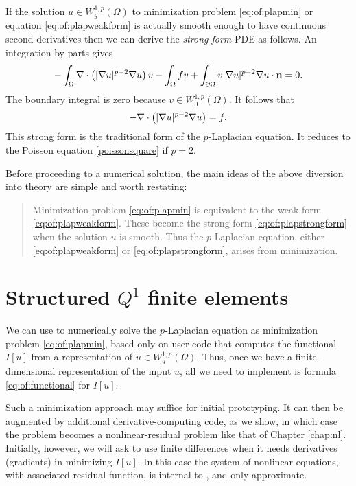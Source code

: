 If the solution $u \in W_g^{1,p}(\Omega)$ to minimization problem \eqref{eq:of:plapmin} or equation \eqref{eq:of:plapweakform} is actually smooth enough to have continuous second derivatives then we can derive the \emph{strong form} PDE as follows.  An integration-by-parts \citep[Appendix C]{Evans2010} gives
    $$-\int_\Omega \nabla\cdot\left(|\nabla u|^{p-2} \nabla u\right) v - \int_\Omega f v + \int_{\partial \Omega} v |\nabla u|^{p-2} \nabla u \cdot \mathbf{n} = 0.$$
The boundary integral is zero because $v\in W_0^{1,p}(\Omega)$.  It follows that
\begin{equation}
- \nabla\cdot\left(|\nabla u|^{p-2} \nabla u\right) = f.
\label{eq:of:plapstrongform}
\end{equation}
This strong form is the traditional form of the $p$-Laplacian equation.  It reduces to the Poisson equation \eqref{poissonsquare} if $p=2$.

Before proceeding to a numerical solution, the main ideas of the above diversion into theory are simple and worth restating:
\begin{quote}
Minimization problem \eqref{eq:of:plapmin} is equivalent to the weak form \eqref{eq:of:plapweakform}.  These become the strong form \eqref{eq:of:plapstrongform} when the solution $u$ is smooth.  Thus the $p$-Laplacian equation, either \eqref{eq:of:plapweakform} or \eqref{eq:of:plapstrongform}, arises from minimization.
\end{quote}


\section{Structured $Q^1$ finite elements}

We can use \PETSc to numerically solve the $p$-Laplacian equation as minimization problem \eqref{eq:of:plapmin}, based only on user code that computes the functional $I[u]$ from a representation of $u \in W_g^{1,p}(\Omega)$.  Thus, once we have a finite-dimensional representation of the input $u$, all we need to implement is formula \eqref{eq:of:functional} for $I[u]$.

Such a minimization approach may suffice for initial prototyping.  It can then be augmented by additional derivative-computing code, as we show, in which case the problem becomes a nonlinear-residual problem like that of Chapter \ref{chap:nl}.  Initially, however, we will ask \PETSc to use finite differences when it needs derivatives (gradients) in minimizing $I[u]$.  In this case the system of nonlinear equations, with associated residual function, is internal to \PETSc, and only approximate.

